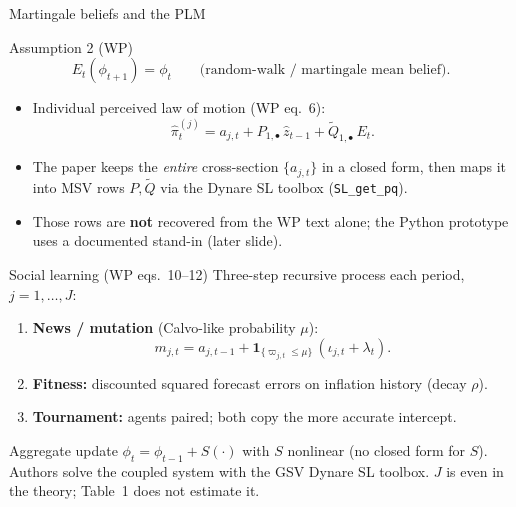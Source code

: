 \documentclass[11pt,aspectratio=169]{beamer}
\newcommand{\Ere}{E_t}
\begin{document}
\begin{frame}{Martingale beliefs and the PLM}
  \begin{block}{Assumption 2 (WP)}
    \[
      \Ere(\phi_{t+1})=\phi_t
      \qquad\text{(random-walk / martingale mean belief).}
    \]
  \end{block}
  \begin{itemize}
    \item Individual perceived law of motion (WP eq.\ 6):
          \[
            \hat\pi_t^{(j)}
            = a_{j,t}
              + P_{1,\bullet}\,\hat z_{t-1}
              + \widetilde Q_{1,\bullet}\,E_t.
          \]
    \item The paper keeps the \emph{entire} cross-section $\{a_{j,t}\}$ in
          a closed form, then maps it into MSV rows $P,\widetilde Q$ via
          the Dynare SL toolbox (\texttt{SL\_get\_pq}).
    \item Those rows are \textbf{not} recovered from the WP text alone;
          the Python prototype uses a documented stand-in (later slide).
  \end{itemize}
\end{frame}

\begin{frame}{Social learning (WP eqs.\ 10--12)}
  Three-step recursive process each period, $j=1,\ldots,J$:
  \begin{enumerate}
    \item \textbf{News / mutation} (Calvo-like probability $\mu$):
          \[
            m_{j,t}
            = a_{j,t-1}
              + \mathbf{1}_{\{\varpi_{j,t}\le\mu\}}
                \,(\iota_{j,t}+\lambda_t).
          \]
    \item \textbf{Fitness:} discounted squared forecast errors on inflation
          history (decay $\rho$).
    \item \textbf{Tournament:} agents paired; both copy the more accurate
          intercept.
  \end{enumerate}
  \vspace{0.4em}
  Aggregate update $\phi_t=\phi_{t-1}+S(\cdot)$ with $S$ nonlinear
  (no closed form for $S$). Authors solve the coupled system with the
  GSV Dynare SL toolbox. $J$ is even in the theory; Table~1 does not
  estimate it.
\end{frame}
\end{document}
